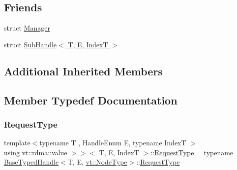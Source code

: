 \subsection*{Friends}
\begin{DoxyCompactItemize}
\item 
struct \hyperlink{structvt_1_1rdma_1_1_handle_3_01_t_00_01_e_00_01_index_t_00_01typename_01std_1_1enable__if__t_3_d15dac1b5db6e2bc0fb0b8aca42b1456_a1fd6b9bc3f72bb2b64e602de3982929d}{Manager}
\item 
struct \hyperlink{structvt_1_1rdma_1_1_handle_3_01_t_00_01_e_00_01_index_t_00_01typename_01std_1_1enable__if__t_3_d15dac1b5db6e2bc0fb0b8aca42b1456_aa597d7381f8793417b0656cbaf1625f0}{Sub\+Handle$<$ T, E, Index\+T $>$}
\end{DoxyCompactItemize}
\subsection*{Additional Inherited Members}


\subsection{Member Typedef Documentation}
\mbox{\label{structvt_1_1rdma_1_1_handle_3_01_t_00_01_e_00_01_index_t_00_01typename_01std_1_1enable__if__t_3_d15dac1b5db6e2bc0fb0b8aca42b1456_a94cb0db8d9b038fb504cb01b1d1d37a9}} 
\subsubsection{\texorpdfstring{Request\+Type}{RequestType}}
{\footnotesize\ttfamily template$<$typename T , Handle\+Enum E, typename IndexT $>$ \\
using vt\+::rdma\+::value $>$$>$$<$ T, E, IndexT $>$\+::\hyperlink{structvt_1_1rdma_1_1_handle_3_01_t_00_01_e_00_01_index_t_00_01typename_01std_1_1enable__if__t_3_d15dac1b5db6e2bc0fb0b8aca42b1456_a94cb0db8d9b038fb504cb01b1d1d37a9}{Request\+Type} =  typename \hyperlink{structvt_1_1rdma_1_1_base_typed_handle}{Base\+Typed\+Handle}$<$T, E, \hyperlink{namespacevt_a866da9d0efc19c0a1ce79e9e492f47e2}{vt\+::\+Node\+Type}$>$\+::\hyperlink{structvt_1_1rdma_1_1_handle_3_01_t_00_01_e_00_01_index_t_00_01typename_01std_1_1enable__if__t_3_d15dac1b5db6e2bc0fb0b8aca42b1456_a94cb0db8d9b038fb504cb01b1d1d37a9}{Request\+Type}}



